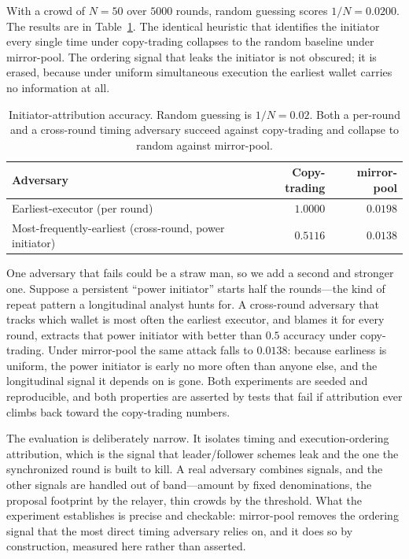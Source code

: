 \documentclass[11pt]{article}
\begin{document}
With a crowd of $N = 50$ over $5000$ rounds, random guessing scores $1/N =
0.0200$. The results are in Table~\ref{tab:eval}. The identical heuristic that
identifies the initiator every single time under copy-trading collapses to the
random baseline under mirror-pool. The ordering signal that leaks the initiator
is not obscured; it is erased, because under uniform simultaneous execution the
earliest wallet carries no information at all.

\begin{table}[h]
\centering
\begin{tabular}{lrr}
\toprule
Adversary & Copy-trading & mirror-pool \\
\midrule
Earliest-executor (per round) & $1.0000$ & $0.0198$ \\
Most-frequently-earliest (cross-round, power initiator) & $0.5116$ & $0.0138$ \\
\bottomrule
\end{tabular}
\caption{Initiator-attribution accuracy. Random guessing is $1/N = 0.02$. Both a
per-round and a cross-round timing adversary succeed against copy-trading and
collapse to random against mirror-pool.}
\label{tab:eval}
\end{table}

One adversary that fails could be a straw man, so we add a second and stronger
one. Suppose a persistent ``power initiator'' starts half the rounds---the kind
of repeat pattern a longitudinal analyst hunts for. A cross-round adversary that
tracks which wallet is most often the earliest executor, and blames it for every
round, extracts that power initiator with better than $0.5$ accuracy under
copy-trading. Under mirror-pool the same attack falls to $0.0138$: because
earliness is uniform, the power initiator is early no more often than anyone
else, and the longitudinal signal it depends on is gone. Both experiments are
seeded and reproducible, and both properties are asserted by tests that fail if
attribution ever climbs back toward the copy-trading numbers.

The evaluation is deliberately narrow. It isolates timing and execution-ordering
attribution, which is the signal that leader/follower schemes leak and the one
the synchronized round is built to kill. A real adversary combines signals, and
the other signals are handled out of band---amount by fixed denominations, the
proposal footprint by the relayer, thin crowds by the threshold. What the
experiment establishes is precise and checkable: mirror-pool removes the ordering
signal that the most direct timing adversary relies on, and it does so by
construction, measured here rather than asserted.
\end{document}
